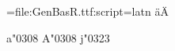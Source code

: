 
\font\test={file:GenBasR.ttf:script=latn}
\test ä\quad Ä

\test a\char"0308
\quad A\char"0308
\quad j\char"0323

\bye
